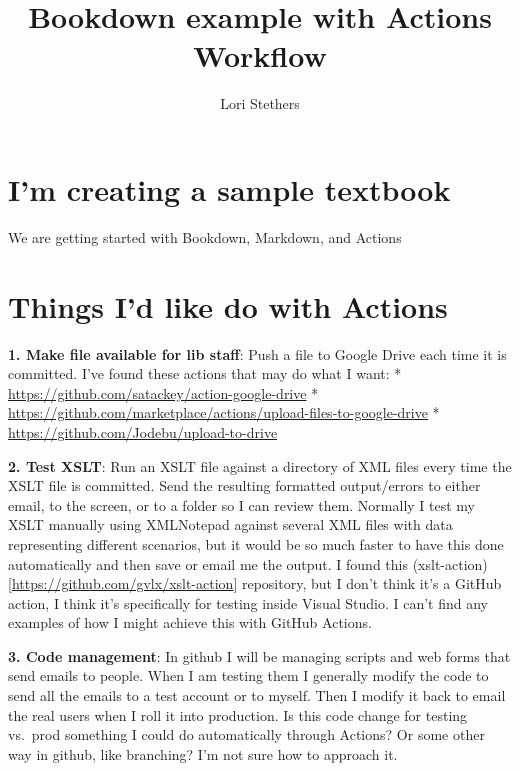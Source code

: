 \documentclass[
  openany]{book}
\title{Bookdown example with Actions Workflow}
\author{Lori Stethers}
\date{}
\begin{document}
\maketitle

{
\setcounter{tocdepth}{1}
\tableofcontents
}
\hypertarget{im-creating-a-sample-textbook}{%
\chapter{I'm creating a sample textbook}\label{im-creating-a-sample-textbook}}

We are getting started with Bookdown, Markdown, and Actions

\hypertarget{things-id-like-do-with-actions}{%
\chapter{Things I'd like do with Actions}\label{things-id-like-do-with-actions}}

\textbf{1. Make file available for lib staff}: Push a file to Google Drive each time it is committed. I've found these actions that may do what I want:
* \url{https://github.com/satackey/action-google-drive}
* \url{https://github.com/marketplace/actions/upload-files-to-google-drive}
* \url{https://github.com/Jodebu/upload-to-drive}

\textbf{2. Test XSLT}: Run an XSLT file against a directory of XML files every time the XSLT file is committed. Send the resulting formatted output/errors to either email, to the screen, or to a folder so I can review them.
Normally I test my XSLT manually using XMLNotepad against several XML files with data representing different scenarios, but it would be so much faster to have this done automatically and then save or email me the output.
I found this (xslt-action){[}\url{https://github.com/gvlx/xslt-action}{]} repository, but I don't think it's a GitHub action, I think it's specifically for testing inside Visual Studio.
I can't find any examples of how I might achieve this with GitHub Actions.

\textbf{3. Code management}: In github I will be managing scripts and web forms that send emails to people. When I am testing them I generally modify the code to send all the emails to a test account or to myself. Then I modify it back to email the real users when I roll it into production. Is this code change for testing vs.~prod something I could do automatically through Actions? Or some other way in github, like branching? I'm not sure how to approach it.
\end{document}
